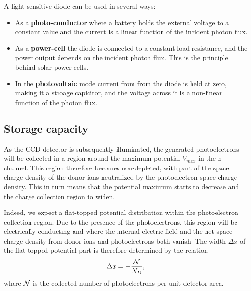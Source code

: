 A light sensitive diode can be used in several ways:
\begin{itemize}
\item As a {\bf photo-conductor} where a battery holds the external voltage
  to a constant value and the current is a linear function of the
  incident photon flux.
\item As a {\bf power-cell} the diode is connected to a constant-load
  resistance, and the power output depends on the incident photon
  flux. This is the principle behind solar power cells.
\item In the {\bf photovoltaic} mode current from from the diode
  is held at zero, making it a stroage capicitor, and the voltage
  across it is a non-linear function of the photon flux.
\end{itemize}

\subsection{Storage capacity}

As the CCD detector is subsequently illuminated, the generated
photoelectrons will be collected in a region around the maximum
potential $V_{max}$ in the n-channel. This region therefore becomes
non-depleted, with part of the space charge density of the donor ions
neutralized by the photoelectron space charge density. This in turn
means that the potential maximum starts to decrease and the charge
collection region to widen. 

Indeed, we expect a flat-topped potential distribution within the
photoelectron collection region. Due to the presence of the
photoelectrons, this region will be electrically conducting and where
the internal electric field and the net space charge density
from donor ions and photoelectrons both vanish. The width $\Delta x$
of the flat-topped potential part is therefore determined by the
relation
\begin{equation}
  \Delta x = -\frac{{\cal N}}{N_D},
\end{equation}
where ${\cal N}$ is the collected number of photoelectrons per unit
detector area.


